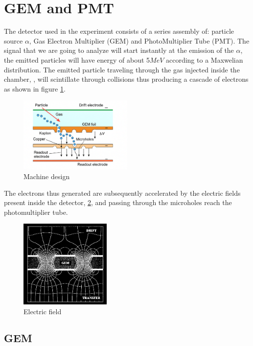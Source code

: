 \documentclass[a4paper,twoside,openany]{book}
\begin{document}
	\section{GEM and PMT}
The detector used in the experiment consists of a series assembly of: particle source $\alpha$, Gas Electron Multiplier (GEM) and PhotoMultiplier Tube (PMT).
The signal that we are going to analyze will start instantly at the emission of the $\alpha$, the emitted particles will have energy of about 5$MeV$ according to a Maxwelian distribution. The emitted particle traveling through the gas injected inside the chamber, , will scintillate through collisions thus producing a cascade of electrons as shown in figure \ref{schema1}.

\begin{figure}[H]
\centering
\includegraphics[width=0.5\textwidth, height=0.4\textwidth]{GEM}
\caption{Machine design}
\label{schema1}
\end{figure}

The electrons thus generated are subsequently accelerated by the electric fields present inside the detector, \ref{campo}, and passing through the microholes reach the photomultiplier tube.

\begin{figure}[H]
\centering
\includegraphics[width=0.4\textwidth, height=0.3\textwidth]{GEM4}
\caption{Electric field}
\label{campo}
\end{figure}

		\subsection{GEM}
\end{document}
